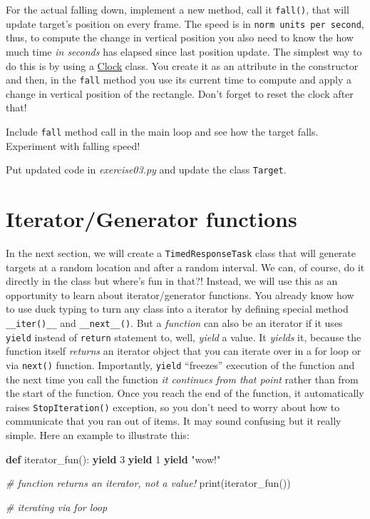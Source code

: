 \documentclass[
]{book}
\newenvironment{Shaded}{\begin{snugshade}}{\end{snugshade}}
\newcommand{\BuiltInTok}[1]{#1}
\newcommand{\CommentTok}[1]{\textcolor[rgb]{0.56,0.35,0.01}{\textit{#1}}}
\newcommand{\ControlFlowTok}[1]{\textcolor[rgb]{0.13,0.29,0.53}{\textbf{#1}}}
\newcommand{\DecValTok}[1]{\textcolor[rgb]{0.00,0.00,0.81}{#1}}
\newcommand{\KeywordTok}[1]{\textcolor[rgb]{0.13,0.29,0.53}{\textbf{#1}}}
\newcommand{\NormalTok}[1]{#1}
\newcommand{\StringTok}[1]{\textcolor[rgb]{0.31,0.60,0.02}{#1}}
\begin{document}
For the actual falling down, implement a new method, call it \texttt{fall()}, that will update target's position on every frame. The speed is in \texttt{norm\ units\ per\ second}, thus, to compute the change in vertical position you also need to know the how much time \emph{in seconds} has elapsed since last position update. The simplest way to do this is by using a \href{https://psychopy.org/api/clock.html\#psychopy.clock.Clock}{Clock} class. You create it as an attribute in the constructor and then, in the \texttt{fall} method you use its current time to compute and apply a change in vertical position of the rectangle. Don't forget to reset the clock after that!

Include \texttt{fall} method call in the main loop and see how the target falls. Experiment with falling speed!

Put updated code in \emph{exercise03.py} and update the class \texttt{Target}.

\hypertarget{iteratorgenerator-functions}{%
\section{Iterator/Generator functions}\label{iteratorgenerator-functions}}

In the next section, we will create a \texttt{TimedResponseTask} class that will generate targets at a random location and after a random interval. We can, of course, do it directly in the class but where's fun in that?! Instead, we will use this as an opportunity to learn about iterator/generator functions. You already know how to use duck typing to turn any class into a iterator by defining special method \texttt{\_\_iter()\_\_} and \texttt{\_\_next\_\_()}. But a \emph{function} can also be an iterator if it uses \texttt{yield} instead of \texttt{return} statement to, well, \emph{yield} a value. It \emph{yields} it, because the function itself \emph{returns} an iterator object that you can iterate over in a for loop or via \texttt{next()} function. Importantly, \texttt{yield} ``freezes'' execution of the function and the next time you call the function \emph{it continues from that point} rather than from the start of the function. Once you reach the end of the function, it automatically raises \texttt{StopIteration()} exception, so you don't need to worry about how to communicate that you ran out of items. It may sound confusing but it really simple. Here an example to illustrate this:

\begin{Shaded}
\begin{Highlighting}[]
\KeywordTok{def}\NormalTok{ iterator\_fun():}
    \ControlFlowTok{yield} \DecValTok{3}
    \ControlFlowTok{yield} \DecValTok{1}
    \ControlFlowTok{yield} \StringTok{"wow!"}
  
\CommentTok{\# function returns an iterator, not a value!}
\BuiltInTok{print}\NormalTok{(iterator\_fun())}

\CommentTok{\# iterating via for loop}
\end{Highlighting}
\end{Shaded}
\end{document}
